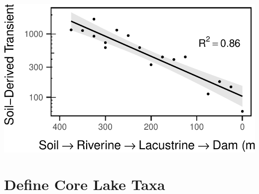 \documentclass[]{article}
\begin{document}
\begin{center}\includegraphics[width=0.7\linewidth]{ReservoirGradient_files/figure-latex/unnamed-chunk-10-1} \end{center}

\section{Define Core Lake Taxa}\label{define-core-lake-taxa}
\end{document}
